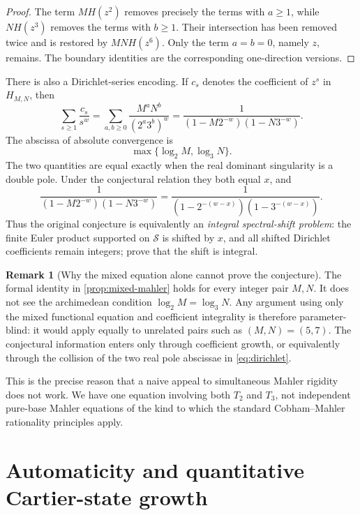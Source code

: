 \documentclass[11pt]{article}
\theoremstyle{definition}
\newtheorem{remark}[theorem]{Remark}
\newcommand{\smooth}{\mathcal{S}}
\begin{document}
\begin{proof}
The term $M H(z^2)$ removes precisely the terms with $a\geq1$, while
$N H(z^3)$ removes the terms with $b\geq1$.  Their intersection has been
removed twice and is restored by $MN H(z^6)$.  Only the term $a=b=0$, namely
$z$, remains.  The boundary identities are the corresponding one-direction
versions.
\end{proof}

There is also a Dirichlet-series encoding.  If $c_s$ denotes the coefficient
of $z^s$ in $H_{M,N}$, then
\begin{equation}
\label{eq:dirichlet}
 \sum_{s\geq1}\frac{c_s}{s^w}
  =\sum_{a,b\geq0}\frac{M^aN^b}{(2^a3^b)^w}
  =\frac{1}{(1-M2^{-w})(1-N3^{-w})}.
\end{equation}
The abscissa of absolute convergence is
\[
       \max\{\log_2M,\log_3N\}.
\]
The two quantities are equal exactly when the real dominant singularity is a
double pole.  Under the conjectural relation they both equal $x$, and
\[
 \frac{1}{(1-M2^{-w})(1-N3^{-w})}
  =\frac{1}{(1-2^{-(w-x)})(1-3^{-(w-x)})}.
\]
Thus the original conjecture is equivalently an \emph{integral spectral-shift
problem}: the finite Euler product supported on $\smooth$ is shifted by $x$,
and all shifted Dirichlet coefficients remain integers; prove that the shift
is integral.

\begin{remark}[Why the mixed equation alone cannot prove the conjecture]
The formal identity in \cref{prop:mixed-mahler} holds for every integer pair
$M,N$.  It does not see the archimedean condition
$\log_2M=\log_3N$.  Any argument using only the mixed functional equation and
coefficient integrality is therefore parameter-blind: it would apply equally
to unrelated pairs such as $(M,N)=(5,7)$.  The conjectural information enters
only through coefficient growth, or equivalently through the collision of the
two real pole abscissae in \cref{eq:dirichlet}.
\end{remark}

This is the precise reason that a naive appeal to simultaneous Mahler
rigidity does not work.  We have one equation involving both $T_2$ and $T_3$,
not independent pure-base Mahler equations of the kind to which the standard
Cobham--Mahler rationality principles apply.

\section{Automaticity and quantitative Cartier-state growth}
\end{document}
